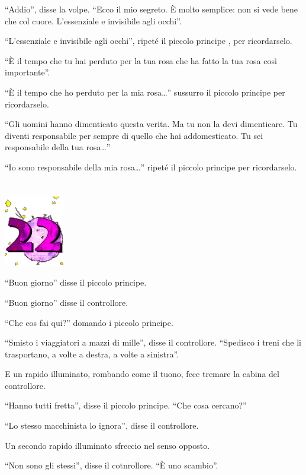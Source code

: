 \documentclass[11pt]{scrbook}
\begin{document}
``Addio'', disse la volpe. ``Ecco il mio segreto. È molto semplice: non
si vede bene che col cuore. L'essenziale e invisibile agli occhi''.

``L'essenziale e invisibile agli occhi'', ripeté il piccolo principe ,
per ricordarselo.

``È il tempo che tu hai perduto per la tua rosa che ha fatto la tua rosa
così importante''.

``È il tempo che ho perduto per la mia rosa\ldots{}'' sussurro il
piccolo principe per ricordarselo.

``Gli uomini hanno dimenticato questa verita. Ma tu non la devi
dimenticare. Tu diventi responsabile per sempre di quello che hai
addomesticato. Tu sei responsabile della tua rosa\ldots{}''

``Io sono responsabile della mia rosa\ldots{}'' ripeté il piccolo
principe per ricordarselo.

\chapter{}
\begin{center}
\includegraphics{img/chapter22}
\end{center}

``Buon giorno'' disse il piccolo principe.

``Buon giorno'' disse il controllore.

``Che cos fai qui?'' domando i piccolo principe.

``Smisto i viaggiatori a mazzi di mille'', disse il controllore.
``Spedisco i treni che li trasportano, a volte a destra, a volte a
sinistra''.

E un rapido illuminato, rombando come il tuono, fece tremare la cabina
del controllore.

``Hanno tutti fretta'', disse il piccolo principe. ``Che cosa cercano?''

``Lo stesso macchinista lo ignora'', disse il controllore.

Un secondo rapido illuminato sfreccio nel senso opposto.

``Non sono gli stessi'', disse il cotnrollore. ``È uno scambio''.
\end{document}
